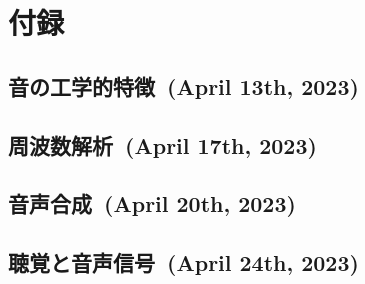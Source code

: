\chapter*{付録}
\pagestyle{appendixstyle}
\setcounter{section}{0}
\renewcommand{\thelstlisting}{\thesection-\arabic{lstlisting}}
\renewcommand{\thesection}{\Alph{section}}
\newcommand{\secref}[1]{#1\ （第\ref{sec:#1}章 →p.\pageref{sec:#1}）}
\makeatletter
{}
\makeatother
{}
\section{音の工学的特徴\ (April 13th, 2023)}
\section{周波数解析\ (April 17th, 2023)}
\section{音声合成\ (April 20th, 2023)}
\section{聴覚と音声信号\ (April 24th, 2023)}